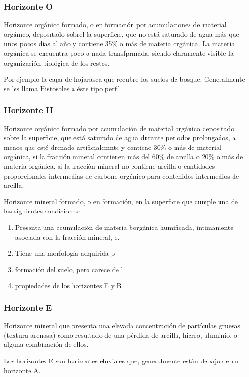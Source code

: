 \subsubsection{Horizonte O}
Horizonte orgánico formado, o en formación por acumulaciones de material orgánico, depositado sobrel la superficie, que no está saturado de agua más que unos pocos días al año y contiene 35\% o más de materia orgánica. La materia orgánica se encuentra poco o nada transfprmada, siendo claramente visible la organización biológica de los restos.

Por ejemplo la capa de hojarasca que recubre los suelos de bosque. Generalmente se les llama Histosoles a éste tipo perfil.

\subsubsection{Horizonte H}
Horizonte orgánico formado por acumulación de material orgánico depositado sobre la superficie, que está saturado de agua durante periodos prolongados, a menos que esté drenado artificialemnte y contiene 30\% o más de material orgánica, si la fracción mineral contienen más del 60\% de arcilla o 20\% o más de materia orgánica, si la fracción mineral no contiene arcilla o cantidades proporcionales intermedias de carbono orgánico para contenidos intermedios de arcilla.

Horizonte mineral formado, o en formación,
en la superficie que cumple una de las
siguientes condiciones:
\begin{enumerate}
    \item Presenta una acumulación de materia borgánica humificada, intimamente asociada con la fracción mineral, o.
    \item Tiene una morfología adquirida p\item formación del suelo, pero carece de l\item propiedades de los horizontes E y B
\end{enumerate}

\subsubsection{Horizonte E}

Horizonte mineral que presenta una elevada concentración de partículas gruesas (textura arenosa) como resultado de una pérdida de arcilla, hierro, aluminio, o alguna combinación de ellos.

Los horizontes E son horizontes eluviales que, generalmente están debajo de un horizonte A.

